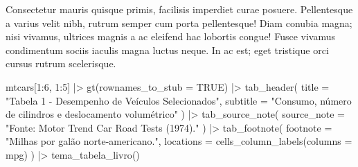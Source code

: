 \documentclass[
  brazilian,
  11pt,
  a4paper,
  open = right,
  twoside = true]{scrbook}
\newenvironment{Shaded}{\begin{snugshade}}{\end{snugshade}}
\newcommand{\AttributeTok}[1]{\textcolor[rgb]{0.00,0.28,0.67}{#1}}
\newcommand{\ConstantTok}[1]{\textcolor[rgb]{0.00,0.77,0.85}{#1}}
\newcommand{\DecValTok}[1]{\textcolor[rgb]{0.55,0.29,0.58}{#1}}
\newcommand{\FunctionTok}[1]{\textcolor[rgb]{1.00,0.23,0.00}{#1}}
\newcommand{\NormalTok}[1]{\textcolor[rgb]{0.10,0.10,0.10}{#1}}
\newcommand{\SpecialCharTok}[1]{\textcolor[rgb]{0.85,0.00,0.31}{#1}}
\newcommand{\StringTok}[1]{\textcolor[rgb]{0.00,0.72,0.25}{#1}}
\begin{document}
Consectetur mauris quisque primis, facilisis imperdiet curae posuere.
Pellentesque a varius velit nibh, rutrum semper cum porta pellentesque!
Diam conubia magna; nisi vivamus, ultrices magnis a ac eleifend hac
lobortis congue! Fusce vivamus condimentum sociis iaculis magna luctus
neque. In ac est; eget tristique orci cursus rutrum scelerisque.

\begin{Shaded}
\begin{Highlighting}[numbers=left,,]
\NormalTok{mtcars[}\DecValTok{1}\SpecialCharTok{:}\DecValTok{6}\NormalTok{, }\DecValTok{1}\SpecialCharTok{:}\DecValTok{5}\NormalTok{] }\SpecialCharTok{|\textgreater{}}
  \FunctionTok{gt}\NormalTok{(}\AttributeTok{rownames\_to\_stub =} \ConstantTok{TRUE}\NormalTok{) }\SpecialCharTok{|\textgreater{}}
  \FunctionTok{tab\_header}\NormalTok{(}
    \AttributeTok{title =} \StringTok{"Tabela 1 {-} Desempenho de Veículos Selecionados"}\NormalTok{,}
    \AttributeTok{subtitle =} \StringTok{"Consumo, número de cilindros e deslocamento volumétrico"}
\NormalTok{  ) }\SpecialCharTok{|\textgreater{}}
  \FunctionTok{tab\_source\_note}\NormalTok{(}
    \AttributeTok{source\_note =} \StringTok{"Fonte: Motor Trend Car Road Tests (1974)."}
\NormalTok{  ) }\SpecialCharTok{|\textgreater{}}
  \FunctionTok{tab\_footnote}\NormalTok{(}
    \AttributeTok{footnote =} \StringTok{"Milhas por galão norte{-}americano."}\NormalTok{,}
    \AttributeTok{locations =} \FunctionTok{cells\_column\_labels}\NormalTok{(}\AttributeTok{columns =}\NormalTok{ mpg)}
\NormalTok{  ) }\SpecialCharTok{|\textgreater{}}
  \FunctionTok{tema\_tabela\_livro}\NormalTok{()}
\end{Highlighting}
\end{Shaded}
\end{document}
